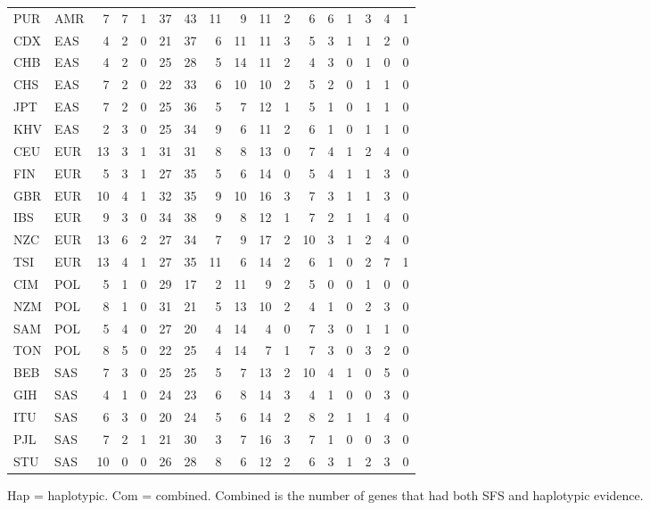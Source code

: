 \documentclass[twoside,openright]{report}
\begin{document}
\begin{table}[!h]
\begin{threeparttable}
\begin{tabular}[t]{llrrrrrrrrrrrrrrr}
PUR & AMR & 7 & 7 & 1 & 37 & 43 & 11 & 9 & 11 & 2 & 6 & 6 & 1 & 3 & 4 & 1\\
CDX & EAS & 4 & 2 & 0 & 21 & 37 & 6 & 11 & 11 & 3 & 5 & 3 & 1 & 1 & 2 & 0\\
CHB & EAS & 4 & 2 & 0 & 25 & 28 & 5 & 14 & 11 & 2 & 4 & 3 & 0 & 1 & 0 & 0\\
CHS & EAS & 7 & 2 & 0 & 22 & 33 & 6 & 10 & 10 & 2 & 5 & 2 & 0 & 1 & 1 & 0\\
JPT & EAS & 7 & 2 & 0 & 25 & 36 & 5 & 7 & 12 & 1 & 5 & 1 & 0 & 1 & 1 & 0\\
KHV & EAS & 2 & 3 & 0 & 25 & 34 & 9 & 6 & 11 & 2 & 6 & 1 & 0 & 1 & 1 & 0\\
CEU & EUR & 13 & 3 & 1 & 31 & 31 & 8 & 8 & 13 & 0 & 7 & 4 & 1 & 2 & 4 & 0\\
FIN & EUR & 5 & 3 & 1 & 27 & 35 & 5 & 6 & 14 & 0 & 5 & 4 & 1 & 1 & 3 & 0\\
GBR & EUR & 10 & 4 & 1 & 32 & 35 & 9 & 10 & 16 & 3 & 7 & 3 & 1 & 1 & 3 & 0\\
IBS & EUR & 9 & 3 & 0 & 34 & 38 & 9 & 8 & 12 & 1 & 7 & 2 & 1 & 1 & 4 & 0\\
NZC & EUR & 13 & 6 & 2 & 27 & 34 & 7 & 9 & 17 & 2 & 10 & 3 & 1 & 2 & 4 & 0\\
TSI & EUR & 13 & 4 & 1 & 27 & 35 & 11 & 6 & 14 & 2 & 6 & 1 & 0 & 2 & 7 & 1\\
CIM & POL & 5 & 1 & 0 & 29 & 17 & 2 & 11 & 9 & 2 & 5 & 0 & 0 & 1 & 0 & 0\\
NZM & POL & 8 & 1 & 0 & 31 & 21 & 5 & 13 & 10 & 2 & 4 & 1 & 0 & 2 & 3 & 0\\
SAM & POL & 5 & 4 & 0 & 27 & 20 & 4 & 14 & 4 & 0 & 7 & 3 & 0 & 1 & 1 & 0\\
TON & POL & 8 & 5 & 0 & 22 & 25 & 4 & 14 & 7 & 1 & 7 & 3 & 0 & 3 & 2 & 0\\
BEB & SAS & 7 & 3 & 0 & 25 & 25 & 5 & 7 & 13 & 2 & 10 & 4 & 1 & 0 & 5 & 0\\
GIH & SAS & 4 & 1 & 0 & 24 & 23 & 6 & 8 & 14 & 3 & 4 & 1 & 0 & 0 & 3 & 0\\
ITU & SAS & 6 & 3 & 0 & 20 & 24 & 5 & 6 & 14 & 2 & 8 & 2 & 1 & 1 & 4 & 0\\
PJL & SAS & 7 & 2 & 1 & 21 & 30 & 3 & 7 & 16 & 3 & 7 & 1 & 0 & 0 & 3 & 0\\
STU & SAS & 10 & 0 & 0 & 26 & 28 & 8 & 6 & 12 & 2 & 6 & 3 & 1 & 2 & 3 & 0\\
\bottomrule
\end{tabular}
\begin{tablenotes}
\item Hap = haplotypic. Com = combined. Combined is the number of genes that had both SFS and haplotypic evidence.
\end{tablenotes}
\end{threeparttable}
\end{table}
\end{document}
